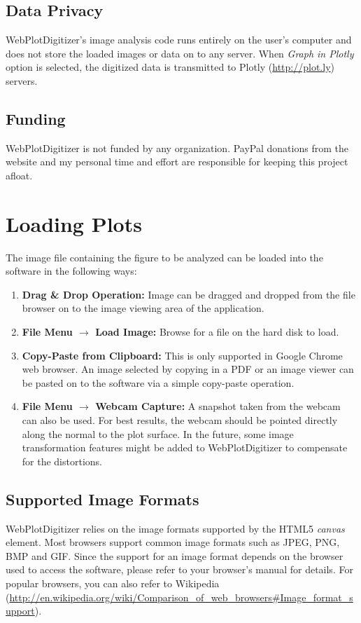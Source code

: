 \documentclass[letterpaper, 10pt]{article}
\begin{document}
\subsection{Data Privacy}
WebPlotDigitizer's image analysis code runs entirely on the user's computer and does not store the loaded images or data on to any server. When \emph{Graph in Plotly} option is selected, the digitized data is transmitted to Plotly (\url{http://plot.ly}) servers.

\subsection{Funding}
WebPlotDigitizer is not funded by any organization. PayPal donations from the website and my personal time and effort are responsible for keeping this project afloat.

\section{Loading Plots}
The image file containing the figure to be analyzed can be loaded into the software in the following ways:
\begin{enumerate}
\item{{\bf Drag \& Drop Operation:} Image can be dragged and dropped from the file browser on to the image viewing area of the application.}
\item{{\bf File Menu $\rightarrow$ Load Image:} Browse for a file on the hard disk to load.}
\item{{\bf Copy-Paste from Clipboard:} This is only supported in Google Chrome web browser. An image selected by copying in a PDF or an image viewer can be pasted on to the software via a simple copy-paste operation.}
\item{{\bf File Menu $\rightarrow$ Webcam Capture:} A snapshot taken from the webcam can also be used. For best results, the webcam should be pointed directly along the normal to the plot surface. In the future, some image transformation features might be added to WebPlotDigitizer to compensate for the distortions.}  
\end{enumerate}

\subsection{Supported Image Formats}
WebPlotDigitizer relies on the image formats supported by the HTML5 \emph{canvas} element. Most browsers support common image formats such as JPEG, PNG, BMP and GIF. Since the support for an image format depends on the browser used to access the software, please refer to your browser's manual for details. For popular browsers, you can also refer to Wikipedia (\url{http://en.wikipedia.org/wiki/Comparison_of_web_browsers#Image_format_support}).
\end{document}
